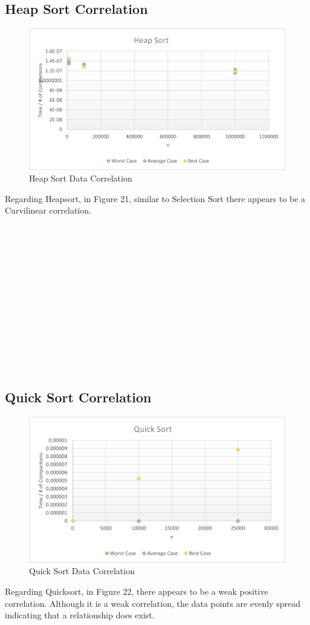 \documentclass[12pt]{article}
\begin{document}
\subsection{Heap Sort Correlation} 
\begin{figure}[h]
	\centering
	\includegraphics[width=\textwidth]{Hcorr2.png}
	\caption{Heap Sort Data Correlation}
	\label{fig:mesh1}
\end{figure}
Regarding Heapsort, in Figure 21, similar to Selection Sort there appears to be a Curvilinear correlation.
\indent
\\
\\
\\
\\
\\
\\
\\
\\
\\
\\
\\
\\
\\
\\
\subsection{Quick Sort Correlation} 
\begin{figure}[h]
	\centering
	\includegraphics[width=\textwidth]{Qcorr.png}
	\caption{Quick Sort Data Correlation}
	\label{fig:mesh1}
\end{figure}
Regarding Quicksort, in Figure 22, there appears to be a weak positive correlation. Although it is a weak correlation, the data points are evenly spread indicating that a relationship does exist.
\end{document}
